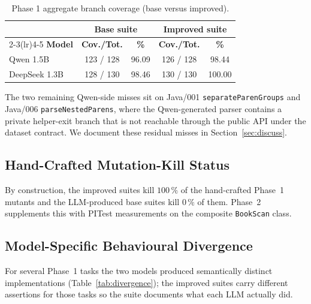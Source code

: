 \documentclass[journal]{IEEEtran}
\begin{document}
\begin{table}[!t]
\renewcommand{\arraystretch}{1.15}
\caption{Phase 1 aggregate branch coverage (base versus improved).}
\label{tab:phase1-cov}
\centering
\footnotesize
\begin{tabular}{@{}lcccc@{}}
\toprule
& \multicolumn{2}{c}{\textbf{Base suite}} & \multicolumn{2}{c}{\textbf{Improved suite}} \\
\cmidrule(lr){2-3}\cmidrule(lr){4-5}
\textbf{Model}    & \textbf{Cov./Tot.} & \textbf{\%} & \textbf{Cov./Tot.} & \textbf{\%} \\
\midrule
Qwen 1.5B     & 123 / 128 & 96.09 & 126 / 128 &  98.44 \\
DeepSeek 1.3B & 128 / 130 & 98.46 & 130 / 130 & 100.00 \\
\bottomrule
\end{tabular}
\end{table}

The two remaining Qwen-side misses sit on Java/001 \texttt{separateParenGroups}
and Java/006 \texttt{parseNestedParens}, where the Qwen-generated parser
contains a private helper-exit branch that is not reachable through the
public API under the dataset contract. We document these residual misses
in Section~\ref{sec:discuss}.

\subsection{Hand-Crafted Mutation-Kill Status}

By construction, the improved suites kill $100\,\%$ of the hand-crafted
Phase~1 mutants and the LLM-produced base suites kill $0\,\%$ of them.
Phase~2 supplements this with PITest measurements on the composite
\texttt{BookScan} class.

\subsection{Model-Specific Behavioural Divergence}

For several Phase~1 tasks the two models produced semantically distinct
implementations (Table~\ref{tab:divergence}); the improved suites carry
different assertions for those tasks so the suite documents what each LLM
actually did.
\end{document}
